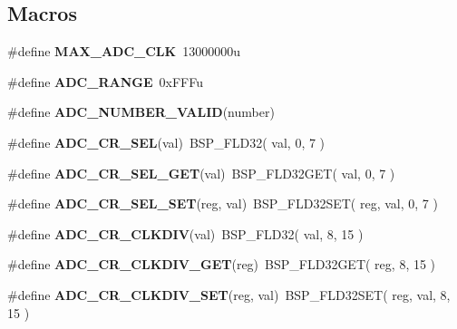\subsection*{Macros}
\begin{DoxyCompactItemize}
\item 
\mbox{\label{adc-defs_8h_a30c4a07bfd20ed8b94f04af1a073eb57}} 
\#define {\bfseries M\+A\+X\+\_\+\+A\+D\+C\+\_\+\+C\+LK}~13000000u
\item 
\mbox{\label{adc-defs_8h_af6510ec9c01be68b14a02327ef5889e1}} 
\#define {\bfseries A\+D\+C\+\_\+\+R\+A\+N\+GE}~0x\+F\+F\+Fu
\item 
\#define {\bfseries A\+D\+C\+\_\+\+N\+U\+M\+B\+E\+R\+\_\+\+V\+A\+L\+ID}(number)
\item 
\mbox{\label{adc-defs_8h_a9e8597a212a4e16c4438961c83523727}} 
\#define {\bfseries A\+D\+C\+\_\+\+C\+R\+\_\+\+S\+EL}(val)~B\+S\+P\+\_\+\+F\+L\+D32( val, 0, 7 )
\item 
\mbox{\label{adc-defs_8h_a9310a2ca0e39af497fd44cff43411778}} 
\#define {\bfseries A\+D\+C\+\_\+\+C\+R\+\_\+\+S\+E\+L\+\_\+\+G\+ET}(val)~B\+S\+P\+\_\+\+F\+L\+D32\+G\+ET( val, 0, 7 )
\item 
\mbox{\label{adc-defs_8h_a3ea84117221bdf0208914a7d016c8b9e}} 
\#define {\bfseries A\+D\+C\+\_\+\+C\+R\+\_\+\+S\+E\+L\+\_\+\+S\+ET}(reg,  val)~B\+S\+P\+\_\+\+F\+L\+D32\+S\+ET( reg, val, 0, 7 )
\item 
\mbox{\label{adc-defs_8h_a62d0f67fed82472986d94b6a86009916}} 
\#define {\bfseries A\+D\+C\+\_\+\+C\+R\+\_\+\+C\+L\+K\+D\+IV}(val)~B\+S\+P\+\_\+\+F\+L\+D32( val, 8, 15 )
\item 
\mbox{\label{adc-defs_8h_adda98376af09977af1fcef9722f07d2d}} 
\#define {\bfseries A\+D\+C\+\_\+\+C\+R\+\_\+\+C\+L\+K\+D\+I\+V\+\_\+\+G\+ET}(reg)~B\+S\+P\+\_\+\+F\+L\+D32\+G\+ET( reg, 8, 15 )
\item 
\mbox{\label{adc-defs_8h_a1ca3c6ae519308808d44bcf9058d1045}} 
\#define {\bfseries A\+D\+C\+\_\+\+C\+R\+\_\+\+C\+L\+K\+D\+I\+V\+\_\+\+S\+ET}(reg,  val)~B\+S\+P\+\_\+\+F\+L\+D32\+S\+ET( reg, val, 8, 15 )
\item 

\end{DoxyCompactItemize}
